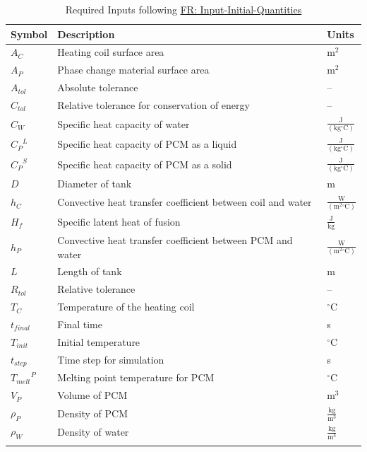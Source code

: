 \documentclass[12pt]{article}
\begin{document}
\begin{longtabu}{l X[l] l}
\toprule
Symbol & Description & Units
\\
\midrule
\endhead
${A_{C}}$ & Heating coil surface area & $\text{m}^{2}$
\\
${A_{P}}$ & Phase change material surface area & $\text{m}^{2}$
\\
${A_{tol}}$ & Absolute tolerance & --
\\
${C_{tol}}$ & Relative tolerance for conservation of energy & --
\\
${C_{W}}$ & Specific heat capacity of water & $\frac{\text{J}}{(\text{kg}{}^{\circ}\text{C})}$
\\
${{C_{P}}^{L}}$ & Specific heat capacity of PCM as a liquid & $\frac{\text{J}}{(\text{kg}{}^{\circ}\text{C})}$
\\
${{C_{P}}^{S}}$ & Specific heat capacity of PCM as a solid & $\frac{\text{J}}{(\text{kg}{}^{\circ}\text{C})}$
\\
$D$ & Diameter of tank & m
\\
${h_{C}}$ & Convective heat transfer coefficient between coil and water & $\frac{\text{W}}{(\text{m}^{2}{}^{\circ}\text{C})}$
\\
${H_{f}}$ & Specific latent heat of fusion & $\frac{\text{J}}{\text{kg}}$
\\
${h_{P}}$ & Convective heat transfer coefficient between PCM and water & $\frac{\text{W}}{(\text{m}^{2}{}^{\circ}\text{C})}$
\\
$L$ & Length of tank & m
\\
${R_{tol}}$ & Relative tolerance & --
\\
${T_{C}}$ & Temperature of the heating coil & ${}^{\circ}$C
\\
${t_{final}}$ & Final time & s
\\
${T_{init}}$ & Initial temperature & ${}^{\circ}$C
\\
${t_{step}}$ & Time step for simulation & s
\\
${{T_{melt}}^{P}}$ & Melting point temperature for PCM & ${}^{\circ}$C
\\
${V_{P}}$ & Volume of PCM & $\text{m}^{3}$
\\
${ρ_{P}}$ & Density of PCM & $\frac{\text{kg}}{\text{m}^{3}}$
\\
${ρ_{W}}$ & Density of water & $\frac{\text{kg}}{\text{m}^{3}}$
\\
\bottomrule
\caption{Required Inputs following \hyperref[inputInitQuants]{FR: Input-Initial-Quantities}}
\label{Table:ReqInputs}
\end{longtabu}
\end{document}
